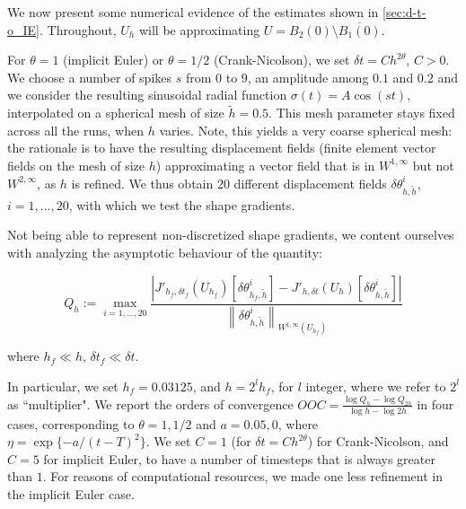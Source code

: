 \documentclass[english,a4paper,9pt,oneside]{scrbook}	%
\theoremstyle{break}
\theoremstyle{remark}
\newcommand{\ds}{\displaystyle}
\newcommand{\norm}[1]{\left\lVert#1\right\rVert}
\newcommand{\te}{\theta}
\begin{document}
We now present some numerical evidence of the estimates shown in \cref{sec:d-t-o_IE}. Throughout, $U_h$ will be approximating $U = B_2(0)\setminus \overline{B_1(0)}$.

For $\theta=1$ (implicit Euler) or $\theta=1/2$ (Crank-Nicolson), we set $\delta t = C h^{2\theta}$, $C>0$. We choose a number of spikes $s$ from $0$ to $9$, an amplitude among $0.1$ and $0.2$ and we consider the resulting sinusoidal radial function $\sigma(t) = A \cos(st)$, interpolated on a spherical mesh of size $\tilde{h} = 0.5$. This mesh parameter stays fixed across all the runs, when $h$ varies. Note, this yields a very coarse spherical mesh: the rationale is to have the resulting displacement fields (finite element vector fields on the mesh of size $h$) approximating a vector field that is in $W^{1,\infty}$ but not $W^{2,\infty}$, as $h$ is refined. We thus obtain $20$ different displacement fields $\delta \te_{h,\tilde{h}}^i$, $i=1,...,20$, with which we test the shape gradients.  


Not being able to represent non-discretized shape gradients, we content ourselves with analyzing the asymptotic behaviour of the quantity:

$$Q_h:=\max_{i=1,...,20}\frac{|J'_{h_f,\delta t_f}(U_{h_f})[\delta \te_{h_f,\tilde{h}}^i]-J'_{h,\delta t}(U_h)[\delta \te_{h,\tilde{h}}^i]|}{\norm{\delta \te_{h,\tilde{h}}^i}_{W^{1,\infty}(U_{h_f})}}$$

where $h_f \ll h$, $\delta t_f \ll \delta t$.

In particular, we set $h_f = 0.03125$, and $h = 2^l h_f$, for $l$ integer, where we refer to $2^l$ as ``multiplier". We report the orders of convergence $\ds OOC =  \frac{\log Q_h-\log Q_{2h}}{\log h - \log 2h}$ in four cases, corresponding to $\theta =1, 1/2$ and $a = 0.05, 0$, where $\eta =\exp\{-a/(t-T)^2\} $. We set $C=1$ (for $\delta t = C h^{2\theta}$) for Crank-Nicolson, and $C=5$ for implicit Euler, to have a number of timesteps that is always greater than $1$. For reasons of computational resources, we made one less refinement in the implicit Euler case.
%
\end{document}
